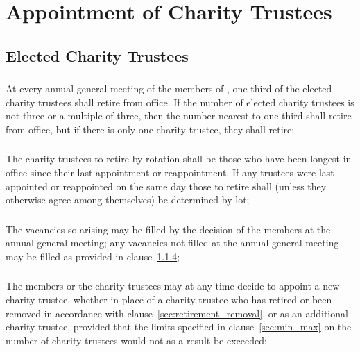 \section{Appointment of Charity Trustees}\label{sec:appointment}

    \subsection{Elected Charity Trustees}

        \subsubsection{}\label{sec:one_third_retire}
        At every annual general meeting of the members of \shortname{}, one-third of the elected charity trustees shall retire from office. If the number of elected charity trustees is not three or a multiple of three, then the number nearest to one-third shall retire from office, but if there is only one charity trustee, they shall retire;

        \subsubsection{}\label{sec:rotation_retirement}
        The charity trustees to retire by rotation shall be those who have been longest in office since their last appointment or reappointment. If any trustees were last appointed or reappointed on the same day those to retire shall (unless they otherwise agree among themselves) be determined by lot;

        \subsubsection{}\label{sec:trustee_vacancy}
        The vacancies so arising may be  filled by the decision of the members at the annual general meeting; any vacancies not  filled at the annual general meeting may be  filled as provided in clause~\ref{sec:appoint_new_trustee};

        \subsubsection{}\label{sec:appoint_new_trustee}
        The members or the charity trustees may at any time decide to appoint a new charity trustee, whether in place of a charity trustee who has retired or been removed in accordance with clause~\ref{sec:retirement_removal}, or as an additional charity trustee, provided that the limits specified in clause~\ref{sec:min_max} on the number of charity trustees would not as a result be exceeded;

